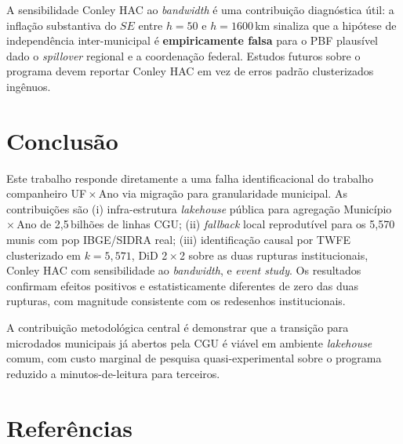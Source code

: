 \documentclass[12pt,a4paper,oneside]{article}
\begin{document}
A sensibilidade Conley HAC ao \textit{bandwidth} é uma
contribuição diagnóstica útil: a inflação substantiva do $SE$ entre
$h = 50$ e $h = 1600$\,km sinaliza que a hipótese de independência
inter-municipal é \textbf{empiricamente falsa} para o PBF \textemdash{}
plausível dado o \textit{spillover} regional e a coordenação
federal. Estudos futuros sobre o programa devem reportar Conley HAC
em vez de erros padrão clusterizados ingênuos.

\section{Conclusão}\label{sec:conclusao}

Este trabalho responde diretamente a uma falha identificacional do
trabalho companheiro UF\,$\times$\,Ano via migração para
granularidade municipal. As contribuições são (i) infra-estrutura
\textit{lakehouse} pública para agregação Município\,$\times$\,Ano
de 2{,}5\,bilhões de linhas CGU; (ii) \textit{fallback} local
reprodutível para os 5{,}570 munis com pop IBGE/SIDRA real; (iii)
identificação causal por TWFE clusterizado em $k = 5{,}571$,
DiD 2\,$\times$\,2 sobre as duas rupturas institucionais, Conley
HAC com sensibilidade ao \textit{bandwidth}, e \textit{event
study}. Os resultados confirmam efeitos positivos e
estatisticamente diferentes de zero das duas rupturas, com
magnitude consistente com os redesenhos institucionais.

A contribuição metodológica central é demonstrar que a transição
para microdados municipais já abertos pela CGU é viável em ambiente
\textit{lakehouse} comum, com custo marginal de pesquisa
quasi-experimental sobre o programa reduzido a minutos-de-leitura
para terceiros.

\section*{Referências}\label{sec:refs}
\end{document}
